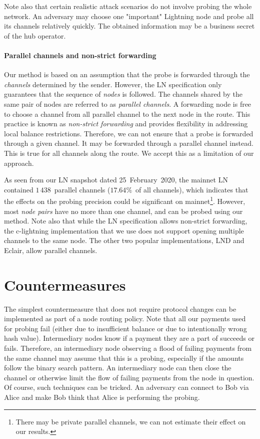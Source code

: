 Note also that certain realistic attack scenarios do not involve probing the whole network.
An adversary may choose one "important" Lightning node and probe all its channels relatively quickly.
The obtained information may be a business secret of the hub operator.


\paragraph{Parallel channels and non-strict forwarding}

Our method is based on an assumption that the probe is forwarded through the \textit{channels} determined by the sender.
However, the LN specification only guarantees that the sequence of \textit{nodes} is followed.
The channels shared by the same pair of nodes are referred to as \textit{parallel channels}.
A forwarding node is free to choose a channel from all parallel channel to the next node in the route.
This practice is known as \textit{non-strict forwarding} and provides flexibility in addressing local balance restrictions.
Therefore, we can not ensure that a probe is forwarded through a given channel.
It may be forwarded through a parallel channel instead.
This is true for all channels along the route.
We accept this as a limitation of our approach.

As seen from our LN snapshot dated 25~February~2020, the mainnet LN contained $1\,438$~parallel channels ($17.64\%$~of all channels), which indicates that the effects on the probing precision could be significant on mainnet\footnote{There may be private parallel channels, we can not estimate their effect on our results.}.
However, most \textit{node pairs} have no more than one channel, and can be probed using our method.
Note also that while the LN specification allows non-strict forwarding, the c-lightning implementation that we use does not support opening multiple channels to the same node.
The other two popular implementations, LND and Eclair, allow parallel channels.


\section{Countermeasures}

The simplest countermeasure that does not require protocol changes can be implemented as part of a node routing policy.
Note that all our payments used for probing fail (either due to insufficient balance or due to intentionally wrong hash value). 
Intermediary nodes know if a payment they are a part of succeeds or fails.
Therefore, an intermediary node observing a flood of failing payments from the same channel may assume that this is a probing, especially if the amounts follow the binary search pattern.
An intermediary node can then close the channel or otherwise limit the flow of failing payments from the node in question.
Of course, such techniques can be tricked.
An adversary can connect to Bob via Alice and make Bob think that Alice is performing the probing.

